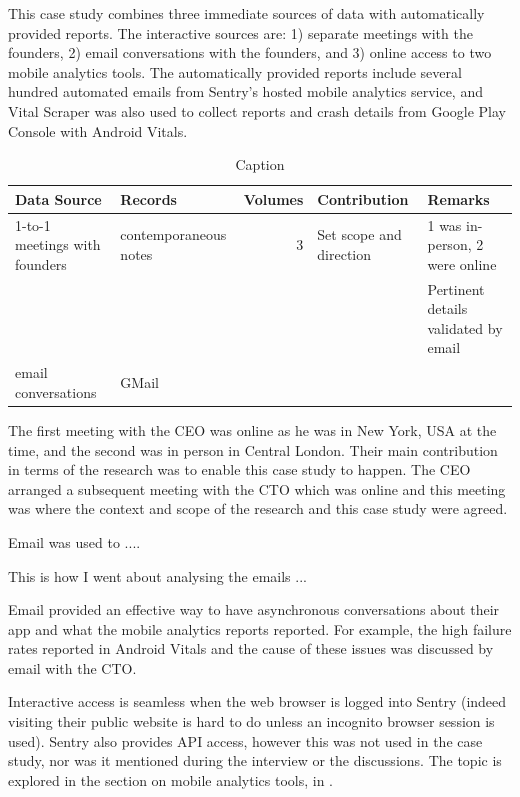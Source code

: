 This case study combines three immediate sources of data with automatically provided reports. The interactive sources are: 1) separate meetings with the founders, 2) email conversations with the founders, and 3) online access to two mobile analytics tools. The automatically provided reports include several hundred automated emails from Sentry's hosted mobile analytics service, and Vital Scraper was also used to collect reports and crash details from Google Play Console with Android Vitals.

\begin{table}
    \centering
    \begin{tabular}{llrll}
        Data Source & Records & Volumes & Contribution & Remarks \\
        \toprule
         1-to-1 meetings with founders & contemporaneous notes & 3 & Set scope and direction & 1 was in-person, 2 were online \\
         & & & & Pertinent details validated by email \\
         \midrule
         email conversations & GMail & & & \\
         \bottomrule
    \end{tabular}
    \caption{Caption}
    \label{tab:my_label}
\end{table}


The first meeting with the CEO was online as he was in New York, USA at the time, and the second was in person in Central London. Their main contribution in terms of the research was to enable this case study to happen. The CEO arranged a subsequent meeting with the CTO which was online and this meeting was where the context and scope of the research and this case study were agreed. 

Email was used to ....

This is how I went about analysing the emails ...

Email provided an effective way to have asynchronous conversations about their app and what the mobile analytics reports reported. For example, the high failure rates reported in Android Vitals and the cause of these issues was discussed by email with the CTO. 


Interactive access is seamless when the web browser is logged into Sentry (indeed visiting their public website is hard to do unless an incognito browser session is used). Sentry also provides API access, however this was not used in the case study, nor was it mentioned during the interview or the discussions. The topic is explored in the section on mobile analytics tools, in \href{analytics-tools-sentry}{}. 

